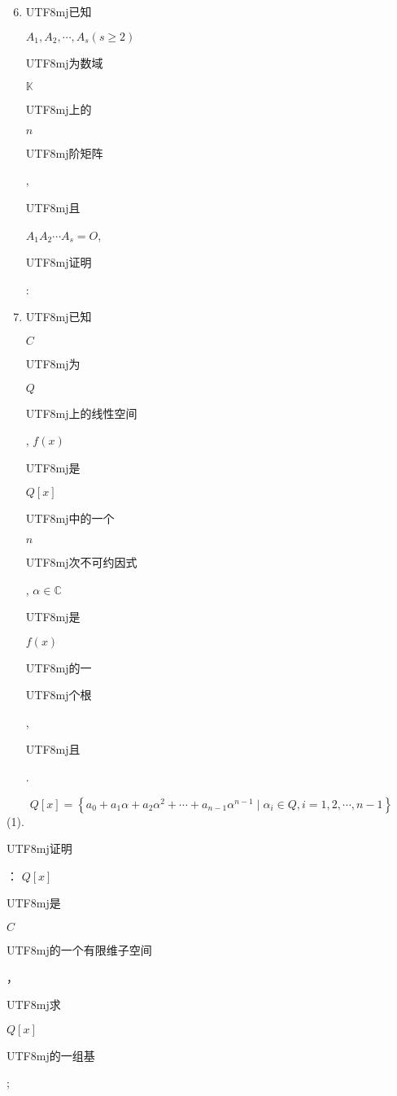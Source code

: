 \documentclass[10pt]{article}
\begin{document}
\begin{enumerate}
  \setcounter{enumi}{5}
  \item \begin{CJK}{UTF8}{mj}已知\end{CJK} $A_{1}, A_{2}, \cdots, A_{s}(s \geq 2)$ \begin{CJK}{UTF8}{mj}为数域\end{CJK} $\mathbb{K}$ \begin{CJK}{UTF8}{mj}上的\end{CJK} $n$ \begin{CJK}{UTF8}{mj}阶矩阵\end{CJK}, \begin{CJK}{UTF8}{mj}且\end{CJK} $A_{1} A_{2} \cdots A_{s}=O$, \begin{CJK}{UTF8}{mj}证明\end{CJK}:

  \item \begin{CJK}{UTF8}{mj}已知\end{CJK} $C$ \begin{CJK}{UTF8}{mj}为\end{CJK} $Q$ \begin{CJK}{UTF8}{mj}上的线性空间\end{CJK}, $f(x)$ \begin{CJK}{UTF8}{mj}是\end{CJK} $Q[x]$ \begin{CJK}{UTF8}{mj}中的一个\end{CJK} $n$ \begin{CJK}{UTF8}{mj}次不可约因式\end{CJK}, $\alpha \in \mathbb{C}$ \begin{CJK}{UTF8}{mj}是\end{CJK} $f(x)$ \begin{CJK}{UTF8}{mj}的一\end{CJK} \begin{CJK}{UTF8}{mj}个根\end{CJK}, \begin{CJK}{UTF8}{mj}且\end{CJK}.

\end{enumerate}
$$
Q[x]=\left\{a_{0}+a_{1} \alpha+a_{2} \alpha^{2}+\cdots+a_{n-1} \alpha^{n-1} \mid \alpha_{i} \in Q, i=1,2, \cdots, n-1\right\}
$$
(1). \begin{CJK}{UTF8}{mj}证明\end{CJK}： $Q[x]$ \begin{CJK}{UTF8}{mj}是\end{CJK} $C$ \begin{CJK}{UTF8}{mj}的一个有限维子空间\end{CJK}，\begin{CJK}{UTF8}{mj}求\end{CJK} $Q[x]$ \begin{CJK}{UTF8}{mj}的一组基\end{CJK};
\end{document}
